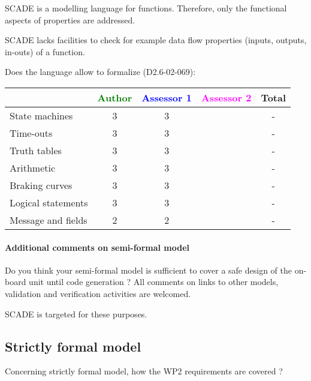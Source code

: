 \begin{author_comment}
SCADE is a modelling language for functions. Therefore, only the functional aspects of properties are addressed.  
\end{author_comment}


\begin{assessor1}
  SCADE lacks facilities to check for example data flow properties
  (inputs, outputs, in-outs) of a function.
\end{assessor1}


Does the language allow to  formalize (D2.6-02-069):

\begin{tabular}{|l | c | c | c | c|}
\hline
& \textcolor{green}{Author} & \textcolor{blue}{Assessor 1} & \textcolor{magenta}{Assessor 2} & Total \\
\hline 
State machines  & 3    & 3    & & - \\
\hline
Time-outs  & 3    & 3    & & - \\
\hline
Truth tables  & 3    & 3    & & - \\
\hline
Arithmetic  & 3    & 3    & & - \\
\hline
Braking curves  & 3    & 3    & & - \\
\hline
Logical statements & 3    & 3    & & - \\
\hline
Message and fields & 2    & 2    & & - \\
\hline
\end{tabular}

\paragraph{Additional comments on semi-formal  model} Do you think your semi-formal  model is sufficient to cover a safe design of the on-board unit until code generation ?
All comments on links to  other models, validation and verification activities are welcomed.

\begin{author_comment}
SCADE is targeted for these purposes.   
\end{author_comment}


\subsection{Strictly formal model}

Concerning strictly formal model, how the WP2 requirements are covered ?

